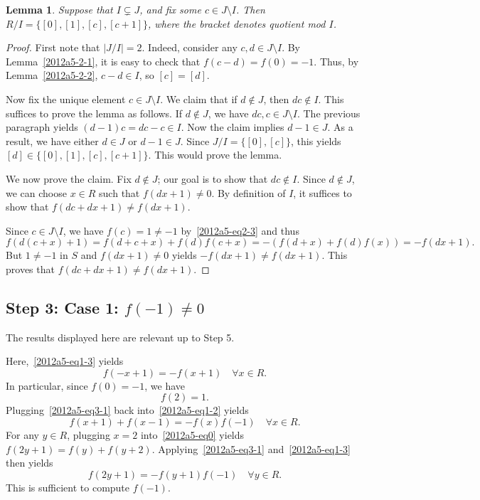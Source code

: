 \documentclass{article}
\newtheorem{lemma}{Lemma}
\begin{document}
\begin{lemma}\label{2012a5-2-3}
Suppose that $I \subsetneq J$, and fix some $c \in J \setminus I$.
Then $R/I = \{[0], [1], [c], [c + 1]\}$, where the bracket denotes quotient mod $I$.
\end{lemma}
\begin{proof}
First note that $|J/I| = 2$.
Indeed, consider any $c, d \in J \setminus I$.
By Lemma~\ref{2012a5-2-1}, it is easy to check that $f(c - d) = f(0) = -1$.
Thus, by Lemma~\ref{2012a5-2-2}, $c - d \in I$, so $[c] = [d]$.

Now fix the unique element $c \in J \setminus I$.
We claim that if $d \notin J$, then $dc \notin I$.
This suffices to prove the lemma as follows.
If $d \notin J$, we have $dc, c \in J \setminus I$.
The previous paragraph yields $(d - 1) c = dc - c \in I$.
Now the claim implies $d - 1 \in J$.
As a result, we have either $d \in J$ or $d - 1 \in J$.
Since $J/I = \{[0], [c]\}$, this yields $[d] \in \{[0], [1], [c], [c + 1]\}$.
This would prove the lemma.

We now prove the claim.
Fix $d \notin J$; our goal is to show that $dc \notin I$.
Since $d \notin J$, we can choose $x \in R$ such that $f(dx + 1) \neq 0$.
By definition of $I$, it suffices to show that $f(dc + dx + 1) \neq f(dx + 1)$.

Since $c \in J \setminus I$, we have $f(c) = 1 \neq -1$ by~\eqref{2012a5-eq2-3} and thus
\[ f(d(c + x) + 1) = f(d + c + x) + f(d) f(c + x) = -(f(d + x) + f(d) f(x)) = -f(dx + 1). \]
But $1 \neq -1$ in $S$ and $f(dx + 1) \neq 0$ yields $-f(dx + 1) \neq f(dx + 1)$.
This proves that $f(dc + dx + 1) \neq f(dx + 1)$.
\end{proof}









\subsection*{Step 3: Case 1: $f(-1) \neq 0$}

The results displayed here are relevant up to Step 5.

Here,~\eqref{2012a5-eq1-3} yields
\[ f(-x + 1) = -f(x + 1) \quad \forall x \in R. \tag{3.1}\label{2012a5-eq3-1} \]
In particular, since $f(0) = -1$, we have
\[ f(2) = 1. \tag{3.2}\label{2012a5-eq3-2} \]
Plugging~\eqref{2012a5-eq3-1} back into~\eqref{2012a5-eq1-2} yields
\[ f(x + 1) + f(x - 1) = -f(x) f(-1) \quad \forall x \in R. \tag{3.3}\label{2012a5-eq3-3} \]
For any $y \in R$, plugging $x = 2$ into~\eqref{2012a5-eq0} yields $f(2y + 1) = f(y) + f(y + 2)$.
Applying~\eqref{2012a5-eq3-1} and~\eqref{2012a5-eq1-3} then yields
\[ f(2y + 1) = -f(y + 1) f(-1) \quad \forall y \in R. \tag{3.4}\label{2012a5-eq3-4} \]
This is sufficient to compute $f(-1)$.
\end{document}
